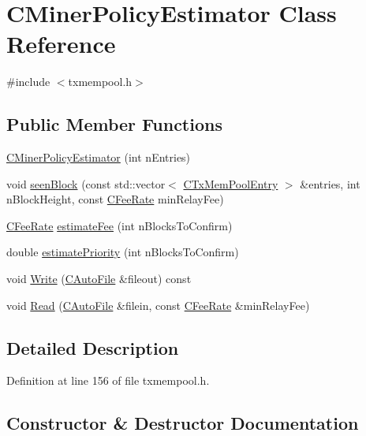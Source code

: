 \hypertarget{class_c_miner_policy_estimator}{}\section{C\+Miner\+Policy\+Estimator Class Reference}
\label{class_c_miner_policy_estimator}


{\ttfamily \#include $<$txmempool.\+h$>$}

\subsection*{Public Member Functions}
\begin{DoxyCompactItemize}
\item 
\hyperlink{class_c_miner_policy_estimator_a13e8fe709d07a3e6b1bf31fbc128a998}{C\+Miner\+Policy\+Estimator} (int n\+Entries)
\item 
void \hyperlink{class_c_miner_policy_estimator_a2b30e1eaa7eec2744c576fba5bd1a168}{seen\+Block} (const std\+::vector$<$ \hyperlink{class_c_tx_mem_pool_entry}{C\+Tx\+Mem\+Pool\+Entry} $>$ \&entries, int n\+Block\+Height, const \hyperlink{class_c_fee_rate}{C\+Fee\+Rate} min\+Relay\+Fee)
\item 
\hyperlink{class_c_fee_rate}{C\+Fee\+Rate} \hyperlink{class_c_miner_policy_estimator_a00b6f58a508ee87999910972f37b3281}{estimate\+Fee} (int n\+Blocks\+To\+Confirm)
\item 
double \hyperlink{class_c_miner_policy_estimator_ae9bb4813622680e6e3b48ea8c0ce41b6}{estimate\+Priority} (int n\+Blocks\+To\+Confirm)
\item 
void \hyperlink{class_c_miner_policy_estimator_aeb98d716f91294503bd5738589ffe6c3}{Write} (\hyperlink{class_c_auto_file}{C\+Auto\+File} \&fileout) const 
\item 
void \hyperlink{class_c_miner_policy_estimator_a86e709bc44e9f6f597519173f15595ff}{Read} (\hyperlink{class_c_auto_file}{C\+Auto\+File} \&filein, const \hyperlink{class_c_fee_rate}{C\+Fee\+Rate} \&min\+Relay\+Fee)
\end{DoxyCompactItemize}


\subsection{Detailed Description}


Definition at line 156 of file txmempool.\+h.



\subsection{Constructor \& Destructor Documentation}
\hypertarget{class_c_miner_policy_estimator_a13e8fe709d07a3e6b1bf31fbc128a998}{}
